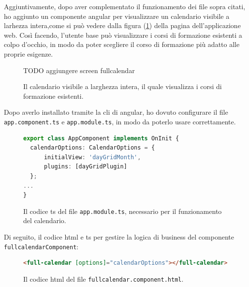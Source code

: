 Aggiuntivamente, dopo aver complementato il funzionamento dei file sopra citati, ho aggiunto un componente \gls{angular} per visualizzare un calendario visibile a larhezza intera,come si può vedere dalla figura (\ref{fig:fullcalendar}) della pagina dell'applicazione web. Così facendo, l'utente base può visualizzare i corsi di formazione esistenti a colpo d'occhio, in modo da poter scegliere il corso di formazione più adatto alle proprie esigenze.
\begin{figure}[H]
\centering
TODO aggiungere screen fullcalendar
\caption{\label{fig:fullcalendar}Il calendario visibile a larghezza intera, il quale visualizza i corsi di formazione esistenti.}
\end{figure}

Dopo averlo installato tramite la \acrshort{cli} di \gls{angular}, ho dovuto configurare il file \texttt{app.component.ts} e \texttt{app.module.ts}, in modo da poterlo usare correttamente.
\begin{figure}[H]
\centering
\begin{lstlisting}[language=TYPESCRIPT, linewidth=20cm, basicstyle=\tiny]
export class AppComponent implements OnInit {
  calendarOptions: CalendarOptions = {
      initialView: 'dayGridMonth',
      plugins: [dayGridPlugin]
  };
...
}
\end{lstlisting}
\caption{\label{fig:fullcalendar module}Il codice \acrshort{ts} del file \texttt{app.module.ts}, necessario per il funzionamento del calendario.}
\end{figure}

Di seguito, il codice \acrshort{html} e \acrshort{ts} per gestire la logica di business del componente \texttt{fullcalendarComponent}:
\begin{figure}[H]
\centering
\begin{lstlisting}[language=HTML, linewidth=20cm, basicstyle=\tiny]
<full-calendar [options]="calendarOptions"></full-calendar>
\end{lstlisting}
\caption{\label{fig:fullcalendar.html}Il codice \acrshort{html} del file \texttt{fullcalendar.component.html}.}
\end{figure}

